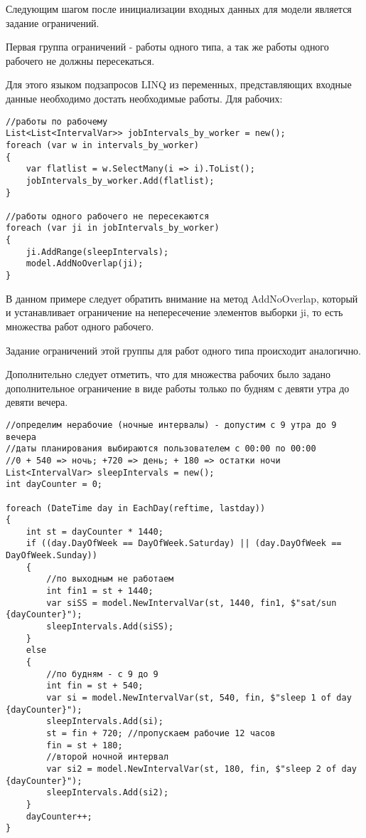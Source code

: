 Следующим шагом после инициализации входных данных для модели является задание ограничений.

Первая группа ограничений - работы одного типа, а так же работы одного рабочего не должны пересекаться.

Для этого языком подзапросов LINQ из переменных, представляющих входные данные необходимо достать необходимые работы. Для рабочих:
\begin{verbatim}
//работы по рабочему
List<List<IntervalVar>> jobIntervals_by_worker = new();
foreach (var w in intervals_by_worker)
{
    var flatlist = w.SelectMany(i => i).ToList();
    jobIntervals_by_worker.Add(flatlist);
}

//работы одного рабочего не пересекаются
foreach (var ji in jobIntervals_by_worker)
{
    ji.AddRange(sleepIntervals);
    model.AddNoOverlap(ji);
}
\end{verbatim}

В данном примере следует обратить внимание на метод AddNoOverlap, который и устанавливает ограничение на непересечение элементов выборки ji, то есть множества работ одного рабочего.

Задание ограничений этой группы для работ одного типа происходит аналогично.

Дополнительно следует отметить, что для множества рабочих было задано дополнительное ограничение в виде работы только по будням с девяти утра до девяти вечера.

\begin{verbatim}
//определим нерабочие (ночные интервалы) - допустим с 9 утра до 9 вечера
//даты планирования выбираются пользователем с 00:00 по 00:00
//0 + 540 => ночь; +720 => день; + 180 => остатки ночи
List<IntervalVar> sleepIntervals = new();
int dayCounter = 0;

foreach (DateTime day in EachDay(reftime, lastday))
{   
    int st = dayCounter * 1440;
    if ((day.DayOfWeek == DayOfWeek.Saturday) || (day.DayOfWeek == DayOfWeek.Sunday))
    {
        //по выходным не работаем
        int fin1 = st + 1440;
        var siSS = model.NewIntervalVar(st, 1440, fin1, $"sat/sun {dayCounter}");
        sleepIntervals.Add(siSS);
    }
    else
    {
        //по будням - с 9 до 9
        int fin = st + 540;
        var si = model.NewIntervalVar(st, 540, fin, $"sleep 1 of day {dayCounter}");
        sleepIntervals.Add(si);
        st = fin + 720; //пропускаем рабочие 12 часов
        fin = st + 180;
        //второй ночной интервал
        var si2 = model.NewIntervalVar(st, 180, fin, $"sleep 2 of day {dayCounter}");
        sleepIntervals.Add(si2);
    }    
    dayCounter++;
}
\end{verbatim}

